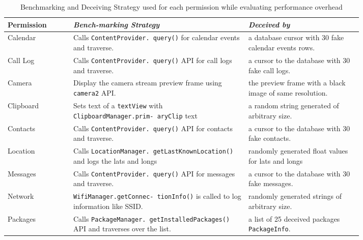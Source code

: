 \begin{table}[h]
    \caption{Benchmarking and Deceiving Strategy used for each permission while evaluating performance overhead }
    {\tiny
    \begin{center}
            \begin{tabular}{|>{\centering}m{0.15\linewidth}|m{0.4\linewidth}|m{0.26\linewidth}|}
                \hline
                \textbf{Permission} & \textbf{\textit{Bench-marking Strategy}} & \textbf{\textit{Deceived by}} \\
                \hline
                Calendar & Calls \texttt{ContentProvider. query()} for calendar events and traverse. & a database cursor with 30 fake calendar events rows.\\
                \hline
                Call Log & Calls \texttt{ContentProvider. query()} API for call logs and traverse. & a cursor to the database with 30 fake call logs. \\
                \hline
                Camera & Display the camera stream preview frame using \texttt{camera2} API. & the preview frame with a black image of same resolution. \\
                \hline
                Clipboard & Sets text of a \texttt{textView} with \texttt{ClipboardManager.prim- aryClip} text & a random string generated of arbitrary size.  \\
                \hline
                Contacts & Calls \texttt{ContentProvider. query()} API for contacts and traverse. & a cursor to the database with 30 fake contacts. \\
                \hline
                Location & Calls \texttt{LocationManager. getLastKnownLocation()} and logs the lats and longs & randomly generated float values  for lats and longs\\
                \hline
                Messages & Calls \texttt{ContentProvider. query()} API for messages and traverse. & a cursor to the database with 30 fake messages. \\
                \hline
                Network & \texttt{WifiManager.getConnec- tionInfo()} is called to log information like SSID. & randomly generated strings of arbitrary size. \\
                \hline
                Packages &  Calls \texttt{PackageManager. getInstalledPackages()} API and traverses over the list. & a list of 25 deceived packages \texttt{PackageInfo}. \\

\end{tabular}
\end{center}}
\end{table}
